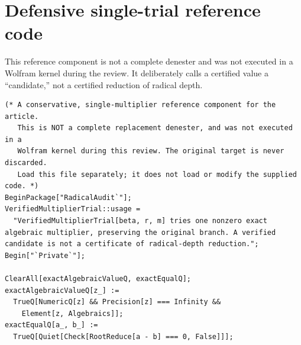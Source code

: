 \documentclass[11pt,letterpaper]{article}
\theoremstyle{definition}
\theoremstyle{remark}
\begin{document}
\section{Defensive single-trial reference code}
\label{app:trial}
This reference component is not a complete denester and was not executed in a
Wolfram kernel during the review. It deliberately calls a certified value a
``candidate,'' not a certified reduction of radical depth.
\begin{lstlisting}
(* A conservative, single-multiplier reference component for the article.
   This is NOT a complete replacement denester, and was not executed in a
   Wolfram kernel during this review. The original target is never discarded.
   Load this file separately; it does not load or modify the supplied code. *)
BeginPackage["RadicalAudit`"];
VerifiedMultiplierTrial::usage =
  "VerifiedMultiplierTrial[beta, r, m] tries one nonzero exact algebraic multiplier, preserving the original branch. A verified candidate is not a certificate of radical-depth reduction.";
Begin["`Private`"];

ClearAll[exactAlgebraicValueQ, exactEqualQ];
exactAlgebraicValueQ[z_] :=
  TrueQ[NumericQ[z] && Precision[z] === Infinity &&
    Element[z, Algebraics]];
exactEqualQ[a_, b_] :=
  TrueQ[Quiet[Check[RootReduce[a - b] === 0, False]]];


\end{lstlisting}
\end{document}
